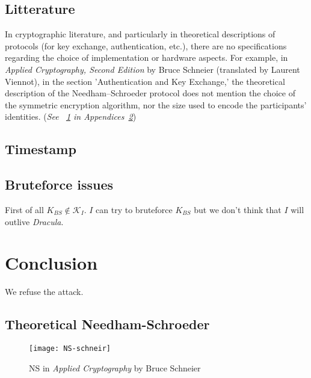 \documentclass[11pt]{article}
\begin{document}
    \subsection{Litterature}

    In cryptographic literature, and particularly in theoretical descriptions of protocols (for key exchange,
    authentication, etc.), there are no specifications regarding the choice of implementation or hardware aspects. For
    example, in \textit{Applied Cryptography, Second Edition} by Bruce Schneier (translated by Laurent Viennot), in the
    section 'Authentication and Key Exchange,' the theoretical description of the Needham–Schroeder protocol does not
    mention the choice of the symmetric encryption algorithm, nor the size used to encode the participants’ identities.
    (\textit{See ~\ref{fig:NS_BS} in Appendices~\ref{ann:NS_BS}})



    \subsection{Timestamp}
    

    
    \subsection{Bruteforce issues}
        First of all $K_{BS} \notin \mathcal{K}_I$. $I$ can try to bruteforce $K_{BS}$ but we don't think that $I$ will outlive \textit{Dracula}.
    

    
    \section{Conclusion}
    We refuse the attack.


    \newpage
    \begin{appendices}

        \section{Theoretical Needham-Schroeder}\label{ann:NS_BS}


        \begin{figure}[h!]
            \centering
            \texttt{[image: NS-schneir]}
            \caption{NS in \textit{Applied Cryptography} by Bruce Schneier}
            \label{fig:NS_BS}
        \end{figure}

    \end{appendices}
\end{document}

